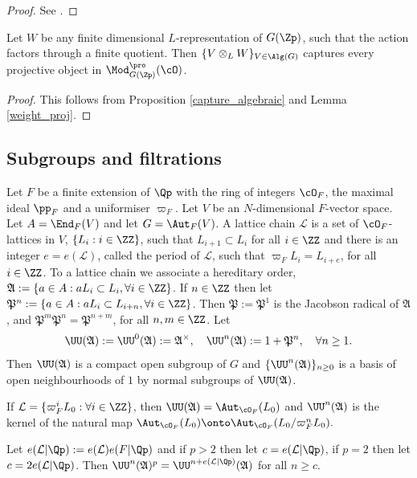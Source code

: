 \begin{proof} See \cite[Prop.\,2.12]{CDP}.
\end{proof}

\begin{cor} Let $W$ be any finite dimensional $L$-representation of $G(\Zp)$, such that the action factors through a finite quotient. Then
$\{V\otimes_L W\}_{V\in \Alg(G)}$ captures every projective object in $\Mod^{\pro}_{G(\Zp)}(\cO)$.
\end{cor}

\begin{proof} This follows from Proposition \ref{capture_algebraic} and Lemma \ref{weight_proj}.
\end{proof}

\subsection{Subgroups and filtrations} Let $F$ be a finite extension of $\Qp$ with the ring of integers $\cO_F$, the maximal ideal
$\pp_F$ and a uniformiser $\varpi_F$. Let $V$ be an $N$-dimensional $F$-vector space.
Let $A=\End_F(V)$ and let $G=\Aut_F(V)$. A lattice chain $\mathcal L$ is a set of $\cO_F$-lattices in $V$, $\{L_i: i\in \ZZ\}$, such that
$L_{i+1}\subset L_i$ for all $i\in \ZZ$ and there is an integer $e=e(\mathcal L)$, called the period of $\mathcal L$, such that $ \varpi_F L_i= L_{i+e}$, for all $i\in \ZZ$.
To a lattice chain we associate a hereditary order,
$\mathfrak A:= \{ a\in A: a L_i\subset L_i, \forall i\in \ZZ\}$. If $n\in \ZZ$ then let $\mathfrak P^n:=\{a\in A: a L_{i} \subset L_{i+n}, \forall i\in \ZZ\}$. Then
$\mathfrak P:=\mathfrak P^1$ is the Jacobson radical of $\mathfrak A$, and $\mathfrak P^m \mathfrak P^n= \mathfrak P^{n+m}$, for all $n, m\in \ZZ$.
Let
\[
\UU(\mathfrak A):=\UU^0(\mathfrak A):=\mathfrak A^{\times}, \quad \UU^n(\mathfrak A):= 1+ \mathfrak P^n, \quad \forall n\ge 1.
\]
Then $\UU(\mathfrak A)$ is a compact open subgroup of $G$ and $\{\UU^n(\mathfrak A)\}_{n\ge 0}$ is a basis of open neighbourhoods of $1$ by normal
subgroups of $\UU(\mathfrak A)$.
\begin{examp}\label{unramified_order} If $\mathcal L=\{ \varpi_F^i L_0: \forall i\in \ZZ\}$, then $\UU(\mathfrak A)=\Aut_{\cO_F}(L_0)$ and $\UU^n(\mathfrak A)$ is the kernel of the
natural map $\Aut_{\cO_F}(L_0)\onto \Aut_{\cO_F}(L_0/\varpi^n_F L_0).$
\end{examp}

\begin{lem}\label{p_power} Let $e(\mathcal L|\Qp):=e(\mathcal L) e(F|\Qp)$ and if $p>2$ then let $c= e(\mathcal L|\Qp)$, if $p=2$ then let $c=2e(\mathcal L|\Qp)$.
Then $\UU^n(\mathfrak A)^p= \UU^{n+e(\mathcal L|\Qp)}(\mathfrak A)$ for all $n\ge c$.
\end{lem}

